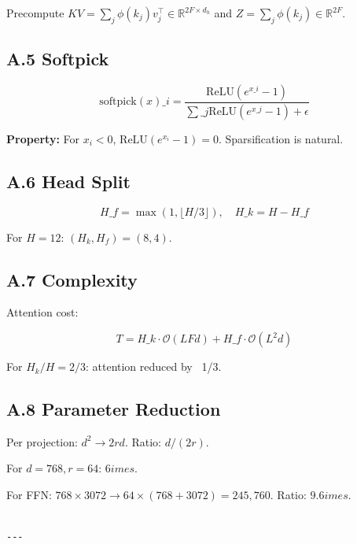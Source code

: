 Precompute $KV = \sum_j \phi(k_j) v_j^\top \in \mathbb{R}^{2F \times d_h}$ 
and $Z = \sum_j \phi(k_j) \in \mathbb{R}^{2F}$.

\subsection{A.5 Softpick}

\[
\text{softpick}(x)\_i = \frac{\text{ReLU}(e^{x\_i} - 1)}{\sum\_j \text{ReLU}(e^{x\_j} - 1) + \epsilon}
\]

\textbf{Property:} For $x_i < 0$, $\text{ReLU}(e^{x_i} - 1) = 0$. Sparsification 
is natural.

\subsection{A.6 Head Split}

\[
H\_f = \max(1, \lfloor H/3 \rfloor), \quad H\_k = H - H\_f
\]

For $H = 12$: $(H_k, H_f) = (8, 4)$.

\subsection{A.7 Complexity}

Attention cost:

\[
T = H\_k \cdot \mathcal{O}(L F d) + H\_f \cdot \mathcal{O}(L^2 d)
\]

For $H_k/H = 2/3$: attention reduced by ~1/3.

\subsection{A.8 Parameter Reduction}

Per projection: $d^2 \to 2rd$. Ratio: $d / (2r)$.

For $d = 768, r = 64$: $6	imes$.

For FFN: $768 \times 3072 \to 64 \times (768 + 3072) = 245,760$. 
Ratio: $9.6	imes$.
\begin{lstlisting}

---
\end{lstlisting}